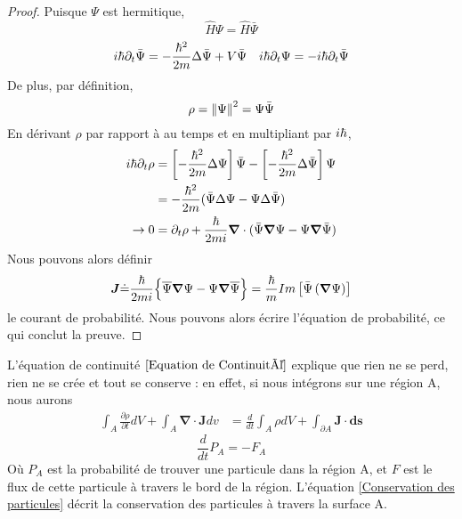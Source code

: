 \documentclass[../notesdecours]{subfiles}
\begin{document}
\begin{proof}
Puisque $\Psi$ est hermitique,
\begin{equation}
\hat{H}\Psi = \hat{H}\bar{\Psi}
\end{equation}
\begin{align}
i\hbar\partial_t\bar{\Psi} &= - \frac{\hbar^2}{2m}\Delta\bar{\Psi}+V\bar{\Psi}	&i\hbar\partial_t\Psi = -i\hbar\partial_t\bar{\Psi}
\end{align}
De plus, par définition,
\begin{equation}
\rho = \norm{\Psi}^2 = \Psi\bar{\Psi}
\end{equation}
En dérivant $\rho$ par rapport à au temps et en multipliant par $i\hbar$,
\begin{align}
i\hbar\partial_t\rho &= \left[-\frac{\hbar^2}{2m}\Delta \Psi\right]\bar{\Psi} - \left[-\frac{\hbar^2}{2m}\Delta\bar{\Psi}\right]\Psi\\
&= -\frac{\hbar^2}{2m} (\bar{\Psi}\Delta\Psi - \Psi\Delta\bar{\Psi})\\
\rightarrow 0 &= \partial_t\rho + \frac{\hbar}{2mi}\bm{\nabla}\cdot(\bar{\Psi}\bm{\nabla}\Psi - \Psi\bm{\nabla}\bar{\Psi})
\end{align}
Nous pouvons alors définir 
\begin{equation}
\bm{J} \dot{=} \frac{\hbar}{2mi} \Big\{\overline{\Psi}\bm{\nabla}\Psi - \Psi\bm{\nabla}\overline{\Psi}\Big\} = \frac{\hbar}{m} Im \left[\bar{\Psi} \left(\bm{\nabla} \Psi\right)\right]
\end{equation}
le courant de probabilité. Nous pouvons alors écrire l'équation de probabilité, ce qui conclut la preuve.
\end{proof}

L'équation de continuité $\eqref{Equation de Continuité}$ explique que rien ne se perd, rien ne se crée et tout se conserve : en effet, si nous intégrons sur une région A, nous aurons
\begin{align*}
\int_A \frac{\partial \rho}{\partial t} dV + \int_A \bm{\nabla}\cdot\bm{J} dv &= \frac{d}{dt} \int_A \rho dV + \int_{\partial A} \bm{J}\cdot\bm{ds}
\end{align*}
\begin{equation}
\frac{d}{dt} P_A = -F_A
\label{Conservation des particules}
\end{equation}
Où $P_A$ est la probabilité de trouver une particule dans la région A, et $F$ est le flux de cette particule à travers le bord de la région. L'équation \eqref{Conservation des particules} décrit la conservation des particules à travers la surface A.\\
\end{document}

